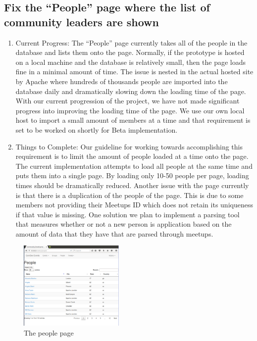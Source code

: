 \documentclass[letterpaper,10pt,onecolumn]{IEEEtran} %
\begin{document}
\subsection{Fix the “People” page where the list of community leaders are shown}
\begin{enumerate}[label*=\arabic*.]
\item Current Progress: The “People” page currently takes all of the people in the database and lists them onto the page. Normally, if the prototype is hosted on a local machine and the database is relatively small, then the page loads fine in a minimal amount of time. The issue is nested in the actual hosted site by Apache where hundreds of thousands people are imported into the database daily and dramatically slowing down the loading time of the page. With our current progression of the project, we have not made significant progress into improving the loading time of the page. We use our own local host to import a small amount of members at a time and that requirement is set to be worked on shortly for Beta implementation.

\item Things to Complete: Our guideline for working towards accomplishing this requirement is to limit the amount of people loaded at a time onto the page. The current implementation attempts to load all people at the same time and puts them into a single page. By loading only 10-50 people per page, loading times should be dramatically reduced. Another issue with the page currently is that there is a duplication of the people of the page. This is due to some members not providing their Meetups ID which does not retain its uniqueness if that value is missing. One solution we plan to implement a parsing tool that measures whether or not a new person is application based on the amount of data that they have that are parsed through meetups.
\end{enumerate}

\begin{figure}[htp]
  \begin{center}
  
  \includegraphics[width=2in]{peoplePage}
  \centering
  \caption{The people page}

  \end{center}
\end{figure}
\end{document}
